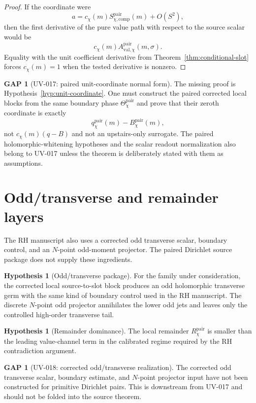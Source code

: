\documentclass[11pt,a4paper]{amsart}
\theoremstyle{plain}
\theoremstyle{definition}
\newtheorem{hypothesis}[theorem]{Hypothesis}
\newtheorem{gap}[theorem]{GAP}
\newcommand{\pair}{\mathrm{pair}}
\newcommand{\comp}{\mathrm{comp}}
\newcommand{\val}{\mathrm{val}}
\begin{document}
\begin{proof}
If the coordinate were
\[
  a=c_\chi(m)S_{\chi,\comp}^{\pair}(m)+O(S^2),
\]
then the first derivative of the pure value path with respect to the source
scalar would be
\[
  c_\chi(m)A_{\val,\chi}^{\pair}(m,\sigma).
\]
Equality with the unit coefficient derivative from
Theorem~\ref{thm:conditional-slot} forces \(c_\chi(m)=1\) when the tested
derivative is nonzero.
\end{proof}

\begin{gap}[UV-017: paired unit-coordinate normal form]
\label{gap:uv017}
The missing proof is Hypothesis~\ref{hyp:unit-coordinate}.  One must construct
the paired corrected local blocks from the same boundary phase
\(\Theta_\chi^{\pair}\) and prove that their zeroth coordinate is exactly
\[
  q_\chi^{\pair}(m)-B_\chi^{\pair}(m),
\]
not \(c_\chi(m)(q-B)\) and not an upstairs-only surrogate.  The paired
holomorphic-whitening hypotheses and the scalar readout normalization also
belong to UV-017 unless the theorem is deliberately stated with them as
assumptions.
\end{gap}

\section{Odd/transverse and remainder layers}
\label{sec:odd}

The RH manuscript also uses a corrected odd transverse scalar, boundary
control, and an \(N\)-point odd-moment projector.  The paired Dirichlet source
package does not supply these ingredients.

\begin{hypothesis}[Odd/transverse package]
\label{hyp:odd}
For the family under consideration, the corrected local source-to-slot block
produces an odd holomorphic transverse germ with the same kind of boundary
control used in the RH manuscript.  The discrete \(N\)-point odd projector
annihilates the lower odd jets and leaves only the controlled high-order
transverse tail.
\end{hypothesis}

\begin{hypothesis}[Remainder dominance]
\label{hyp:remainder}
The local remainder \(R_\chi^{\pair}\) is smaller than the leading value-channel
term in the calibrated regime required by the RH contradiction argument.
\end{hypothesis}

\begin{gap}[UV-018: corrected odd/transverse realization]
\label{gap:uv018}
The corrected odd transverse scalar, boundary estimate, and \(N\)-point
projector input have not been constructed for primitive Dirichlet pairs.  This
is downstream from UV-017 and should not be folded into the source theorem.
\end{gap}
\end{document}
